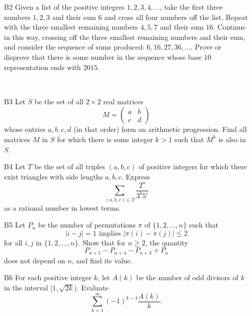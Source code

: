 \documentclass[amssymb,twocolumn,pra,10pt,aps]{revtex4-1}
\begin{document}
\begin{itemize}
\item[B2]
Given a list of the positive integers $1,2,3,4,\dots$, take the first three numbers
$1,2,3$ and their sum $6$ and cross all four numbers off the list. Repeat with the three 
smallest remaining numbers $4,5,7$ and their sum $16$. Continue in this way, crossing off the three smallest remaining numbers and their sum, and consider the sequence of sums produced: $6, 16, 27, 36, \dots$. Prove or disprove that there is some number in the sequence whose base 10 representation ends with $2015$.

\,
\item[B3]
Let $S$ be the set of all $2 \times 2$ real matrices
\[
M = \begin{pmatrix} a & b \\
c & d \end{pmatrix}
\]
whose entries $a,b,c,d$ (in that order) form an arithmetic progression. Find all matrices $M$ in $S$ for which there is some integer $k>1$ such that $M^k$ is also in $S$.

\item[B4]
Let $T$ be the set of all triples $(a,b,c)$ of positive integers for which there exist triangles with side lengths $a,b,c$. Express
\[
\sum_{(a,b,c) \in T} \frac{2^a}{3^b 5^c} 
\]
as a rational number in lowest terms.

\item[B5]
Let $P_n$ be the number of permutations $\pi$ of $\{1,2,\dots,n\}$ such that
\[
|i-j| = 1 \mbox{ implies } |\pi(i) -\pi(j)| \leq 2
\]
for all $i,j$ in $\{1,2,\dots,n\}$. Show that for $n \geq 2$, the quantity
\[
P_{n+5} - P_{n+4} - P_{n+3} + P_n
\]
does not depend on $n$, and find its value.

\item[B6]
For each positive integer $k$, let $A(k)$ be the number of odd divisors of $k$ in the interval $[1, \sqrt{2k})$. Evaluate
\[
\sum_{k=1}^\infty (-1)^{k-1} \frac{A(k)}{k}.
\]

\end{itemize}
\end{document}
